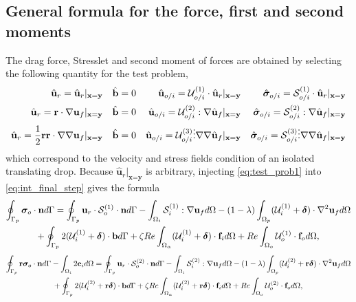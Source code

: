 \subsection{General formula for the force, first and second moments}
The drag force, Stresslet and second moment of forces are obtained by selecting the following quantity for the test problem, 
\begin{align}
    \hat{\textbf{u}}_r = \hat{\textbf{u}}_r|_{\textbf{x}=\textbf{y}} 
    && 
    \hat{\textbf{b}} = 0 
    && 
    \hat{\textbf{u}}_{o/i} = \mathcal{U}_{o/i}^{(1)}\cdot \hat{\textbf{u}}_r|_{\textbf{x}=\textbf{y}} 
    && 
    \hat{\bm\sigma}_{o/i} = \mathcal{S}_{o/i}^{(1)}\cdot \hat{\textbf{u}}_r|_{\textbf{x}=\textbf{y}} \\
    \hat{\textbf{u}}_r =\textbf{r}\cdot  \grad \textbf{u}_f|_{\textbf{x}=\textbf{y}} 
    && 
    \hat{\textbf{b}} = 0 
    && 
    \hat{\textbf{u}}_{o/i} = \mathcal{U}_{o/i}^{(2)} : \grad\hat{\textbf{u}}_f|_{\textbf{x}=\textbf{y}} 
    && 
    \hat{\bm\sigma}_{o/i} = \mathcal{S}_{o/i}^{(2)} : \grad\hat{\textbf{u}}_f|_{\textbf{x}=\textbf{y}} \\
    \hat{\textbf{u}}_r =\frac{1}{2}\textbf{rr}\cdot  \grad\grad \textbf{u}_f|_{\textbf{x}=\textbf{y}} 
    && 
    \hat{\textbf{b}} = 0 
    && 
    \hat{\textbf{u}}_{o/i} = \mathcal{U}_{o/i}^{(3)} \vdots \grad\grad\hat{\textbf{u}}_f|_{\textbf{x}=\textbf{y}} 
    && 
    \hat{\bm\sigma}_{o/i} = \mathcal{S}_{o/i}^{(3)} \vdots \grad\grad\hat{\textbf{u}}_f|_{\textbf{x}=\textbf{y}} 
    \label{eq:test_prob1}
\end{align}
which correspond to the velocity and stress fields condition of an isolated translating drop.
Because $\hat{\textbf{u}}_r|_{\textbf{x}=\textbf{y}} $ is arbitrary, injecting \ref{eq:test_prob1} into \ref{eq:int_final_step} gives the formula
\begin{multline}
    \intS[p]{\bm\sigma_{o}\cdot \textbf{n}}
    =
    \intS[p]{\textbf{u}_{r}\cdot \mathcal{S}_o^{(1)} \cdot \textbf{n}}
    - \intO[i]{ \mathcal{S}_{i}^{(1)} :\grad\textbf{u}_f}
    - (1-\lambda) \intO[p]{(\mathcal{U}_{i}^{(1)} + \bm\delta) \cdot \grad^2   \textbf{u}_f }
    \\ 
    + \intS[p]{2(\mathcal{U}_{i}^{(1)} + \bm\delta) \cdot  \textbf{b}}
    + \zeta Re \intO{(\mathcal{U}_{i}^{(1)} + \bm\delta)\cdot \textbf{f}_{i}} 
    + Re\intO[o]{\mathcal{U}_{o}^{(1)}\cdot \textbf{f}_{o}},
\end{multline}
\begin{multline}
    \intS[p]{\textbf{r}  \bm\sigma_{o}\cdot \textbf{n}}
    - \intO[i]{2\textbf{e}_i}
    =
    \intS[p]{\textbf{u}_{r}\cdot  \mathcal{S}_o^{(2)}\cdot \textbf{n}}
    - \intO[i]{ \mathcal{S}_i^{(2)} :\grad\textbf{u}_f}
    - (1-\lambda) \intO[p]{(\mathcal{U}_{i}^{(2)}  + \textbf{r}\bm\delta) \cdot \grad^2   \textbf{u}_f }
    \\ 
    + \intS[p]{2(\mathcal{U}_{i}^{(2)} + \textbf{r}\bm\delta) \cdot  \textbf{b}}
    + \zeta Re \intO{(\mathcal{U}_{i}^{(2)}  + \textbf{r}\bm\delta)\cdot \textbf{f}_{i}} 
    + Re\intO[o]{\mathcal{U}_{o}^{(2)}\cdot \textbf{f}_{o}},
\end{multline}
